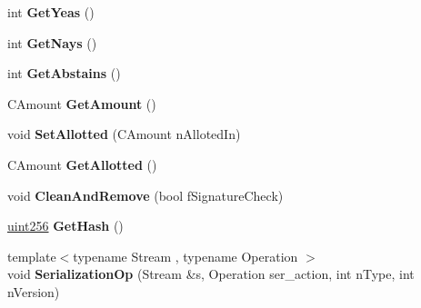 \begin{DoxyCompactItemize}
\mbox{\label{class_c_budget_proposal_afa25c9e366bff2c00ba488ce5d89e0d1}} 
int {\bfseries Get\+Yeas} ()
\item 
\mbox{\label{class_c_budget_proposal_a25210a8820448464f88721937b4570a5}} 
int {\bfseries Get\+Nays} ()
\item 
\mbox{\label{class_c_budget_proposal_aae864c01295cb5f0c8d0fc621b512300}} 
int {\bfseries Get\+Abstains} ()
\item 
\mbox{\label{class_c_budget_proposal_a2053aad4bd3c03675edf6f1ae60fff39}} 
C\+Amount {\bfseries Get\+Amount} ()
\item 
\mbox{\label{class_c_budget_proposal_a23188288e26d836dd95c77ee40d2e18e}} 
void {\bfseries Set\+Allotted} (C\+Amount n\+Alloted\+In)
\item 
\mbox{\label{class_c_budget_proposal_aa331bf9bfe44113a3a3ef2880b5f7936}} 
C\+Amount {\bfseries Get\+Allotted} ()
\item 
\mbox{\label{class_c_budget_proposal_a32204943f3efff468bcf76a92d014424}} 
void {\bfseries Clean\+And\+Remove} (bool f\+Signature\+Check)
\item 
\mbox{\label{class_c_budget_proposal_a7c69d6e50ef8c4870ab5af71d37ae2b7}} 
\mbox{\hyperlink{classuint256}{uint256}} {\bfseries Get\+Hash} ()
\item 
\mbox{\label{class_c_budget_proposal_a583bd01ff4267cf5491033ab57a09094}} 
{\footnotesize template$<$typename Stream , typename Operation $>$ }\\void {\bfseries Serialization\+Op} (Stream \&s, Operation ser\+\_\+action, int n\+Type, int n\+Version)
\end{DoxyCompactItemize}
